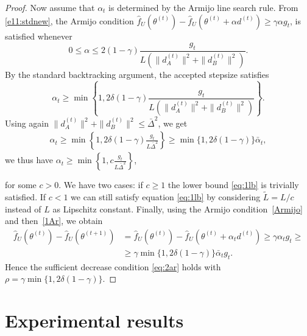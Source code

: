 \documentclass{article}
\begin{document}
\begin{proof}
Now assume that \(\alpha_t\) is determined by the Armijo line search rule. From
\eqref{e11:stdnew}, the Armijo condition $\widehat f_U(\theta^{(t)})
    -
    \widehat f_U(\theta^{(t)}+\alpha d^{(t)})
    \ge
    \gamma \alpha g_t$, 
is satisfied whenever
\[
    0
    \le
    \alpha
    \le
    2(1-\gamma)
    \frac{
        g_t
    }{
        L\left(
            \|d_A^{(t)}\|^2+\|d_B^{(t)}\|^2
        \right)
    }.
\]
By the standard backtracking argument, the accepted stepsize satisfies
\[
    \alpha_t
    \ge
    \min\left\{
        1,
        2\delta(1-\gamma)
        \frac{
            g_t
        }{
            L\left(
                \|d_A^{(t)}\|^2+\|d_B^{(t)}\|^2
            \right)
        }
    \right\}.
\]
Using again $    \|d_A^{(t)}\|^2+\|d_B^{(t)}\|^2
    \le
    \bar\Delta^2$, we get
\begin{equation}\label{1Ar}
\begin{aligned}
    \alpha_t \ge
    \min\left\{
        1,
        2\delta(1-\gamma)
        \frac{g_t}{L\bar\Delta^2}
    \right\} \ge
    \min\{1,2\delta(1-\gamma)\}\bar\alpha_t,
\end{aligned}
\end{equation}
we thus have $\alpha_t \geq
    \min\left\{
        1,c
        \frac{g_t}{L\bar\Delta^2}
    \right\}$,

for some $c>0$. We have two cases: if $c\geq1$ the lower bound \eqref{eq:1lb} is trivially satisfied. If $c<1$ we can still satisfy equation \eqref{eq:1lb} by considering $\tilde L = L/c$ instead of $L$ as Lipschitz constant. Finally, using the Armijo condition~\eqref{Armijo} and then~\eqref{1Ar}, we obtain
\[
\begin{aligned}
    \widehat f_U(\theta^{(t)})
    -
    \widehat f_U(\theta^{(t+1)})
    &=
    \widehat f_U(\theta^{(t)})
    -
    \widehat f_U(\theta^{(t)}+\alpha_t d^{(t)})          \ge
    \gamma \alpha_t g_t              \geq                \\
    &\ge
    \gamma
    \min\{1,2\delta(1-\gamma)\}
    \bar\alpha_t g_t.
\end{aligned}
\]
Hence the sufficient decrease condition \eqref{eq:2ar} holds with $ \rho = \gamma\min\{1,2\delta(1-\gamma)\}$.
\end{proof}



\section{Experimental results}
\label{sec:experiments}
\end{document}
